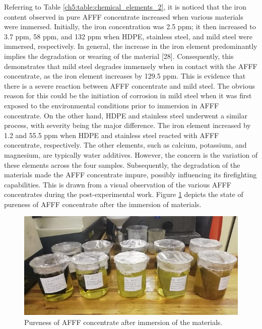 \documentclass[12pt]{report}
\begin{document}
Referring to Table \ref{ch5:table:chemical_elements_2}, it is noticed that the iron content observed in pure AFFF concentrate increased when various materials were immersed. Initially, the iron concentration was 2.5 ppm; it then increased to 3.7 ppm, 58 ppm, and 132 ppm when HDPE, stainless steel, and mild steel were immersed, respectively. In general, the increase in the iron element predominantly implies the degradation or wearing of the material [28]. Consequently, this demonstrates that mild steel degrades immensely when in contact with the AFFF concentrate, as the iron element increases by 129.5 ppm. This is evidence that there is a severe reaction between AFFF concentrate and mild steel. The obvious reason for this could be the initiation of corrosion in mild steel when it was first exposed to the environmental conditions prior to immersion in AFFF concentrate. On the other hand, HDPE and stainless steel underwent a similar process, with severity being the major difference. The iron element increased by 1.2 and 55.5 ppm when HDPE and stainless steel reacted with AFFF concentrate, respectively.
The other elements, such as calcium, potassium, and magnesium, are typically water additives. However, the concern is the variation of these elements across the four samples. Subsequently, the degradation of the materials made the AFFF concentrate impure, possibly influencing its firefighting capabilities. This is drawn from a visual observation of the various AFFF concentrates during the post-experimental work. Figure \ref{ch5:figure:pureness} depicts the state of pureness of AFFF concentrate after the immersion of materials.
 
\begin{figure}[H]
    \centering
    \includegraphics[width=\textwidth]{pureness_of_immersed_afff.jpg}
    \caption{Pureness of AFFF concentrate after immersion of the materials.}
    \label{ch5:figure:pureness}
\end{figure}
\end{document}

